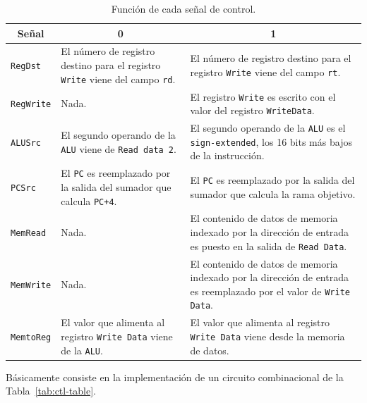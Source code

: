 \documentclass[a4paper]{article}
\begin{document}
\begin{table}[H]
\centering
\begin{tabular}{|p{1.6cm}|p{4.3cm}|p{4.3cm}|}
\hline
\multicolumn{1}{|c|}{\textbf{\textbf{Señal}}} &
  \multicolumn{1}{c|}{\textbf{\textbf{0}}} &
  \multicolumn{1}{c|}{\textbf{\textbf{1}}} \\ \hline
\texttt{RegDst} &
  El número de registro destino para el registro \texttt{Write} viene del campo \texttt{rd}. &
  El número de registro destino para el registro \texttt{Write} viene del campo \texttt{rt}. \\ \hline
\texttt{RegWrite} &
  Nada. &
  El registro \texttt{Write} es escrito con el valor del registro \texttt{WriteData}. \\ \hline
\texttt{ALUSrc} &
  El segundo operando de la \texttt{ALU} viene de \texttt{Read data 2}. &
  El segundo operando de la \texttt{ALU} es el \texttt{sign-extended}, los 16 bits más bajos de la instrucción. \\ \hline
\texttt{PCSrc} &
  El \texttt{PC} es reemplazado por la salida del sumador que calcula \texttt{PC+4}. &
  El \texttt{PC} es reemplazado por la salida del sumador que calcula la rama objetivo. \\ \hline
\texttt{MemRead} &
  Nada. &
  El contenido de datos de memoria indexado por la dirección de entrada es puesto en la salida de \texttt{Read Data}. \\ \hline
\texttt{MemWrite} &
  Nada. &
  El contenido de datos de memoria indexado por la dirección de entrada es reemplazado por el valor de \texttt{Write Data}. \\ \hline
\texttt{MemtoReg} &
  El valor que alimenta al registro \texttt{Write Data} viene de la \texttt{ALU}. &
  El valor que alimenta al registro \texttt{Write Data} viene desde la memoria de datos. \\ \hline
\end{tabular}
\caption{Función de cada señal de control.}
\label{tab:ctl2-table}
\end{table}

\clearpage

Básicamente consiste en la implementación de un circuito combinacional de la Tabla~\ref{tab:ctl-table}.
\end{document}
